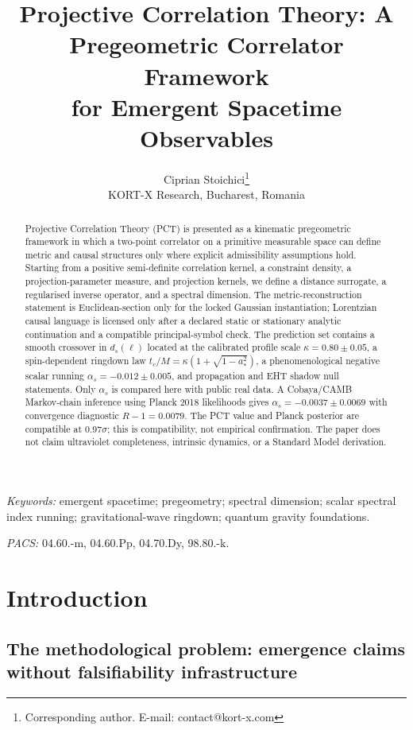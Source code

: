 ﻿\documentclass[12pt,a4paper]{article}
\title{Projective Correlation Theory: A Pregeometric Correlator Framework\\for Emergent Spacetime Observables}
\author{Ciprian Stoichici\thanks{Corresponding author. E-mail: contact@kort-x.com}\\
KORT-X Research, Bucharest, Romania}
\date{}
\theoremstyle{definition}
\begin{document}
\maketitle

\begin{abstract}
\noindent Projective Correlation Theory (PCT) is presented as a kinematic pregeometric framework in which a two-point correlator on a primitive measurable space can define metric and causal structures only where explicit admissibility assumptions hold. Starting from a positive semi-definite correlation kernel, a constraint density, a projection-parameter measure, and projection kernels, we define a distance surrogate, a regularised inverse operator, and a spectral dimension. The metric-reconstruction statement is Euclidean-section only for the locked Gaussian instantiation; Lorentzian causal language is licensed only after a declared static or stationary analytic continuation and a compatible principal-symbol check. The prediction set contains a smooth crossover in $d_s(\ell)$ located at the calibrated profile scale $\kappa=0.80\pm0.05$, a spin-dependent ringdown law $t_c/M=\kappa(1+\sqrt{1-a_\ast^2})$, a phenomenological negative scalar running $\alpha_s=-0.012\pm0.005$, and propagation and EHT shadow null statements. Only $\alpha_s$ is compared here with public real data. A Cobaya/CAMB Markov-chain inference using Planck 2018 likelihoods gives $\alpha_s=-0.0037\pm0.0069$ with convergence diagnostic $R-1=0.0079$. The PCT value and Planck posterior are compatible at $0.97\sigma$; this is compatibility, not empirical confirmation. The paper does not claim ultraviolet completeness, intrinsic dynamics, or a Standard Model derivation.
\end{abstract}

\noindent\emph{Keywords:} emergent spacetime; pregeometry; spectral dimension; scalar spectral index running; gravitational-wave ringdown; quantum gravity foundations.

\vspace{0.5em}
\noindent\emph{PACS:} 04.60.-m, 04.60.Pp, 04.70.Dy, 98.80.-k.

\section{Introduction}
\label{sec:introduction}

\subsection{The methodological problem: emergence claims without falsifiability infrastructure}
\label{sec:intro_problem}
\end{document}
